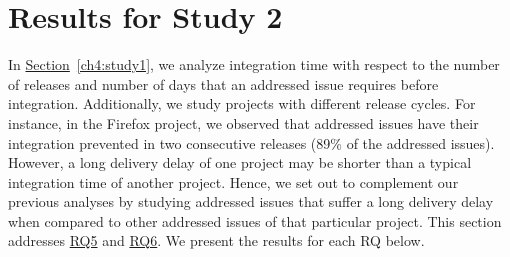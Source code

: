 \section{Results for Study 2} \label{ch4:study2} 

In \hyperref[ch4:study1]{Section}~\ref{ch4:study1}, we analyze integration
time with respect to the number of releases and number of days that an addressed
issue requires before integration. Additionally, we study projects with
different release cycles. For instance, in the Firefox project, we observed that
addressed issues have their integration prevented in two consecutive releases
(89\% of the addressed issues). However, a long delivery delay of one project
may be shorter than a typical integration time of another project. Hence, we set
out to complement our previous analyses by studying addressed issues that suffer
a long delivery delay when compared to other addressed issues of that particular
project.  This section addresses \hyperref[ch4:rq5]{RQ5} and
\hyperref[ch4:rq6]{RQ6}. We present the results for each RQ below.




